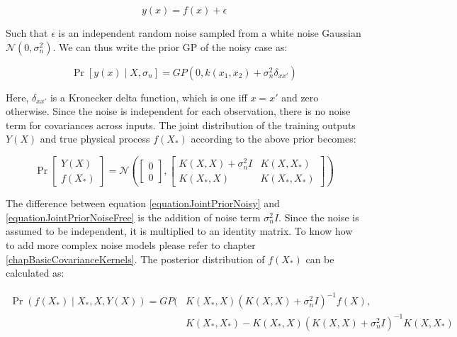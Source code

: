 \begin{equation}\label{eqNoiseEquation}
y(x) = f(x) + \epsilon
\end{equation}

Such that $\epsilon$ is an independent random noise sampled from a white noise Gaussian $\mathcal{N}(0, \sigma_{n}^{2})$. We can thus write the prior GP of the noisy case as:

\begin{equation}\label{equationMeanZeroGPNoisydefinition}
\Pr[y(x) \mid X, \sigma_{n}] = GP(0 , k(x_{1}, x_{2}) + \sigma^{2}_{n}\delta_{xx'})
\end{equation}

Here, $\delta_{xx'}$ is a Kronecker delta function, which is one iff $x = x'$ and zero otherwise. Since the noise is independent for each observation, there is no noise term for covariances across inputs. The joint distribution of the training outputs $Y(X)$ and true physical process $f(X_{*})$ according to the above prior becomes:

\begin{equation}\label{equationJointPriorNoisy}
\Pr\left [ \begin{matrix}
Y(X)
\\ f(X_{*})
\end{matrix} \right ]
= 
\mathcal{N}\left (
\left [ \begin{matrix}
0
\\ 0

\end{matrix} \right ] , \left [ \begin{matrix}
K(X, X) + \sigma^{2}_{n}I & K(X, X_{*})\\ 
K(X_{*}, X) & K(X_{*}, X_{*})
\end{matrix} \right ] 
\right )
\end{equation}

The difference between equation \ref{equationJointPriorNoisy} and \ref{equationJointPriorNoiseFree} is the addition of noise term $\sigma^{2}_{n}I$. Since the noise is assumed to be independent, it is multiplied to an identity matrix. To know how to add more complex noise models please refer to chapter \ref{chapBasicCovarianceKernels}. The posterior distribution of $f(X_{*})$ can be calculated as:

  \begin{equation}\label{eqNoisyPredictiveGP}
  \begin{aligned}
      \Pr(f(X_{*}) \mid X_{*}, X, Y(X)) = GP(  & K(X_{*}, X)( K(X, X) + \sigma^{2}_{n}I)^{-1}f(X),   \\ 
                                & K(X_{*}, X_{*}) - K(X_{*}, X)( K(X, X) + \sigma^{2}_{n}I)^{-1} K(X, X_{*}) 
  \end{aligned}
  \end{equation}


